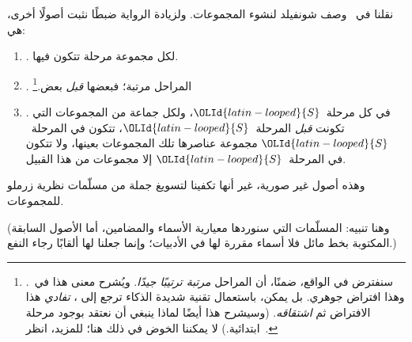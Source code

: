 \documentclass[../../../include/open-logic-section]{subfiles}
\begin{document}
	
نقلنا في~ وصف شونفيلد لنشوء المجموعات.
ولزيادة الرواية ضبطًا نثبت أصولًا أخرى، هي:
\begin{enumerate}
\item[] \stageshier. لكل مجموعة مرحلة تتكون فيها.
\item[] \stagesord. المراحل مرتبة؛ فبعضها \emph{قبل}
بعض.\footnote{سنفترض في الواقع، ضمنًا، أن المراحل \emph{مرتبة
  ترتيبًا جيدًا}. ويُشرح معنى هذا في~.
  وهذا افتراض جوهري. بل يمكن، باستعمال تقنية شديدة الذكاء ترجع إلى
  \citet{Scott1974}، \emph{تفادي} هذا الافتراض ثم \emph{اشتقاقه}.
  (وسيشرح هذا أيضًا لماذا ينبغي أن نعتقد بوجود مرحلة ابتدائية.) لا
  يمكننا الخوض في ذلك هنا؛ للمزيد، انظر~\citet{ButtonLT1}.}
\item[] \stagesacc. في كل مرحلة~${\OLId{latin-looped}{S}}$، ولكل جماعة من المجموعات التي تكونت
  \emph{قبل} المرحلة~${\OLId{latin-looped}{S}}$، تتكون في المرحلة~${\OLId{latin-looped}{S}}$ مجموعة عناصرها تلك
  المجموعات بعينها، ولا تتكون في المرحلة~${\OLId{latin-looped}{S}}$ إلا مجموعات من هذا القبيل.
\end{enumerate}
وهذه أصول غير صورية، غير أنها تكفينا لتسويغ جملة من مسلّمات نظرية
زرملو للمجموعات.

(وهنا تنبيه: المسلّمات التي سنوردها معيارية الأسماء والمضامين، أما
الأصول السابقة المكتوبة بخط مائل فلا أسماء مقررة لها في الأدبيات؛
وإنما جعلنا لها ألقابًا رجاء النفع.)
\end{document}
